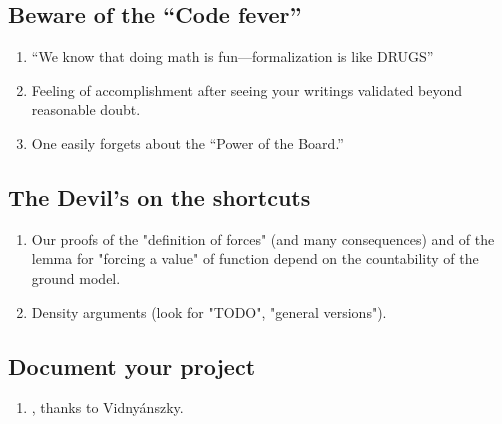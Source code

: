 \subsection{Beware of the “Code fever”}
\begin{enumerate}
\item “We know that doing math is fun---formalization is like DRUGS”
\item Feeling of accomplishment after seeing your writings
  validated beyond reasonable doubt.
\item One easily forgets about the “Power of the Board.”
\end{enumerate}

\subsection{The Devil's on the shortcuts}
\begin{enumerate}
\item
  Our proofs of the "definition of forces" (and many
  consequences) and of the lemma for "forcing a value" of function
  depend on the countability of the ground model. 
\item
  Density arguments (look for "TODO", "general versions").
\end{enumerate}

\subsection{Document your project}
\begin{enumerate}
\item {}, thanks to Vidnyánszky.
\end{enumerate}

